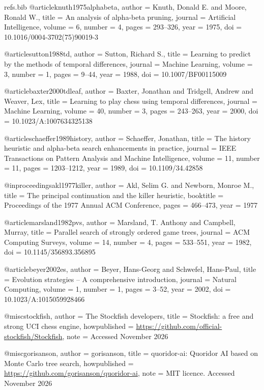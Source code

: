 \begin{filecontents*}[overwrite]{refs.bib}
@article{knuth1975alphabeta,
  author  = {Knuth, Donald E. and Moore, Ronald W.},
  title   = {An analysis of alpha-beta pruning},
  journal = {Artificial Intelligence},
  volume  = {6},
  number  = {4},
  pages   = {293--326},
  year    = {1975},
  doi     = {10.1016/0004-3702(75)90019-3}
}

@article{sutton1988td,
  author  = {Sutton, Richard S.},
  title   = {Learning to predict by the methods of temporal differences},
  journal = {Machine Learning},
  volume  = {3},
  number  = {1},
  pages   = {9--44},
  year    = {1988},
  doi     = {10.1007/BF00115009}
}

@article{baxter2000tdleaf,
  author  = {Baxter, Jonathan and Tridgell, Andrew and Weaver, Lex},
  title   = {Learning to play chess using temporal differences},
  journal = {Machine Learning},
  volume  = {40},
  number  = {3},
  pages   = {243--263},
  year    = {2000},
  doi     = {10.1023/A:1007634325138}
}

@article{schaeffer1989history,
  author  = {Schaeffer, Jonathan},
  title   = {The history heuristic and alpha-beta search enhancements in practice},
  journal = {IEEE Transactions on Pattern Analysis and Machine Intelligence},
  volume  = {11},
  number  = {11},
  pages   = {1203--1212},
  year    = {1989},
  doi     = {10.1109/34.42858}
}

@inproceedings{akl1977killer,
  author    = {Akl, Selim G. and Newborn, Monroe M.},
  title     = {The principal continuation and the killer heuristic},
  booktitle = {Proceedings of the 1977 Annual ACM Conference},
  pages     = {466--473},
  year      = {1977}
}

@article{marsland1982pvs,
  author  = {Marsland, T. Anthony and Campbell, Murray},
  title   = {Parallel search of strongly ordered game trees},
  journal = {ACM Computing Surveys},
  volume  = {14},
  number  = {4},
  pages   = {533--551},
  year    = {1982},
  doi     = {10.1145/356893.356895}
}

@article{beyer2002es,
  author  = {Beyer, Hans-Georg and Schwefel, Hans-Paul},
  title   = {Evolution strategies -- A comprehensive introduction},
  journal = {Natural Computing},
  volume  = {1},
  number  = {1},
  pages   = {3--52},
  year    = {2002},
  doi     = {10.1023/A:1015059928466}
}

@misc{stockfish,
  author       = {{The Stockfish developers}},
  title        = {Stockfish: a free and strong {UCI} chess engine},
  howpublished = {\url{https://github.com/official-stockfish/Stockfish}},
  note         = {Accessed November 2026}
}

@misc{gorisanson,
  author       = {gorisanson},
  title        = {quoridor-ai: {Quoridor} {AI} based on {Monte Carlo} tree search},
  howpublished = {\url{https://github.com/gorisanson/quoridor-ai}},
  note         = {MIT licence. Accessed November 2026}
}
\end{filecontents*}
\documentclass[11pt,a4paper]{article}

